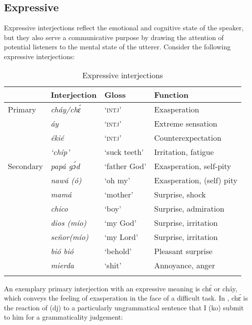 \subsection{Expressive}

Expressive interjections reflect the emotional and cognitive state of the speaker, but they also serve a communicative purpose by drawing the attention of potential listeners to the mental state of the utterer. Consider the following expressive interjections: 

\begin{table}
\caption{Expressive interjections}
\label{tab:key:12.2}

\begin{tabularx}{\textwidth}{Xlll}
\lsptoprule
 & Interjection & Gloss & Function\\
\midrule
 Primary & \itshape cháy/chɛ́ & ‘\textsc{intj}’ & Exasperation\\
& \itshape áy & ‘\textsc{intj}’ & Extreme sensation\\
& \itshape ékié & ‘\textsc{intj}’ & Counterexpectation\\
& \itshape ‘chíp’ & ‘suck teeth’ & Irritation, fatigue\\

\tablevspace
Secondary & \itshape papá gɔ́d & ‘father God’ & Exasperation, self-pity\\
& \itshape nawá (ó) & ‘oh my’ & Exasperation, (self) pity \\
& \itshape mamá & ‘mother’ & Surprise, shock\\
& \itshape chico & ‘boy’ & Surprise, admiration\\
& \itshape dios (mío) & ‘my God’ & Surprise, irritation\\
& \itshape señor(mío) & ‘my Lord’ & Surprise, irritation\\
& \itshape bió bió & ‘behold’ & Pleasant surprise\\
& \itshape mierda & ‘shit’ & Annoyance, anger\\
\lspbottomrule
\end{tabularx}
\end{table}
An exemplary primary interjection with an expressive meaning is chɛ́ or cháy, which conveys the feeling of exasperation in the face of a difficult task. In , chɛ́ is the reaction of (dj) to a particularly ungrammatical sentence that I (ko) submit to him for a grammaticality judgement:


